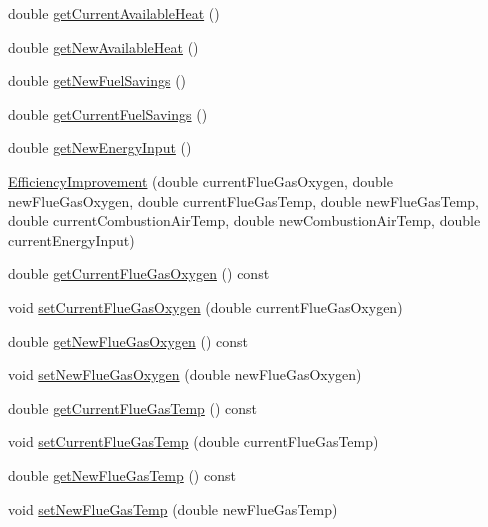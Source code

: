 \begin{DoxyCompactItemize}
\item 
double \hyperlink{class_efficiency_improvement_a4f1ef470ee88c9d3ac05be0bd5755157}{get\+Current\+Available\+Heat} ()
\item 
double \hyperlink{class_efficiency_improvement_a37df0eb5d1dc43627e947a610f2a9c08}{get\+New\+Available\+Heat} ()
\item 
double \hyperlink{class_efficiency_improvement_a1b85007b7b046b998443f5eb267822f9}{get\+New\+Fuel\+Savings} ()
\item 
double \hyperlink{class_efficiency_improvement_ab2e940be7192df960c9eb9578096796f}{get\+Current\+Fuel\+Savings} ()
\item 
double \hyperlink{class_efficiency_improvement_a3c31caaed812edb8c465b53dc9029810}{get\+New\+Energy\+Input} ()
\item 
\hyperlink{class_efficiency_improvement_a84e4463e307cd280360a4dfbbb369c55}{Efficiency\+Improvement} (double current\+Flue\+Gas\+Oxygen, double new\+Flue\+Gas\+Oxygen, double current\+Flue\+Gas\+Temp, double new\+Flue\+Gas\+Temp, double current\+Combustion\+Air\+Temp, double new\+Combustion\+Air\+Temp, double current\+Energy\+Input)
\item 
double \hyperlink{class_efficiency_improvement_a8b66a676d696f7a9fcc8fa987371d80b}{get\+Current\+Flue\+Gas\+Oxygen} () const
\item 
void \hyperlink{class_efficiency_improvement_a038c378d51a5baf96521012a572bb106}{set\+Current\+Flue\+Gas\+Oxygen} (double current\+Flue\+Gas\+Oxygen)
\item 
double \hyperlink{class_efficiency_improvement_a46dbfa28b53f36de80dd730c07b294f1}{get\+New\+Flue\+Gas\+Oxygen} () const
\item 
void \hyperlink{class_efficiency_improvement_a111f7e30d302b4e71103a2ec6d199e2c}{set\+New\+Flue\+Gas\+Oxygen} (double new\+Flue\+Gas\+Oxygen)
\item 
double \hyperlink{class_efficiency_improvement_a27e97b5c7aad8aa6b4d02e18354d2292}{get\+Current\+Flue\+Gas\+Temp} () const
\item 
void \hyperlink{class_efficiency_improvement_aef6ffeae5135982ef223ce4a5efe23d8}{set\+Current\+Flue\+Gas\+Temp} (double current\+Flue\+Gas\+Temp)
\item 
double \hyperlink{class_efficiency_improvement_a4de84ef27e3b4c518319fea77d039845}{get\+New\+Flue\+Gas\+Temp} () const
\item 
void \hyperlink{class_efficiency_improvement_ab88d3976fca8f55bb1fd3278bc427fc1}{set\+New\+Flue\+Gas\+Temp} (double new\+Flue\+Gas\+Temp)

\end{DoxyCompactItemize}
